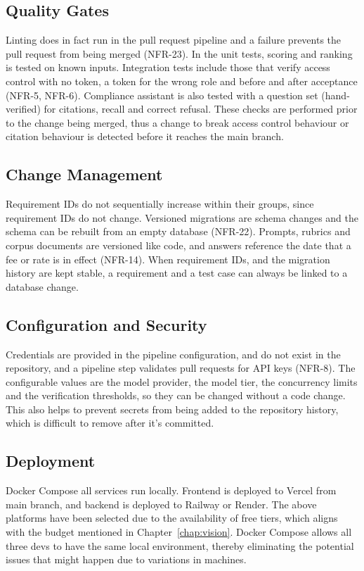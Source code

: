 \documentclass{FastFyp}
\begin{document}
\subsection{Quality Gates}
Linting does in fact run in the pull request pipeline and a failure prevents the pull request from being merged (NFR-23). In the unit tests, scoring and ranking is tested on known inputs. Integration tests include those that verify access control with no token, a token for the wrong role and before and after acceptance (NFR-5, NFR-6). Compliance assistant is also tested with a question set (hand-verified) for citations, recall and correct refusal. These checks are performed prior to the change being merged, thus a change to break access control behaviour or citation behaviour is detected before it reaches the main branch.

\subsection{Change Management}
Requirement IDs do not sequentially increase within their groups, since requirement IDs do not change. Versioned migrations are schema changes and the schema can be rebuilt from an empty database (NFR-22). Prompts, rubrics and corpus documents are versioned like code, and answers reference the date that a fee or rate is in effect (NFR-14). When requirement IDs, and the migration history are kept stable, a requirement and a test case can always be linked to a database change.

\subsection{Configuration and Security}
Credentials are provided in the pipeline configuration, and do not exist in the repository, and a pipeline step validates pull requests for API keys (NFR-8). The configurable values are the model provider, the model tier, the concurrency limits and the verification thresholds, so they can be changed without a code change. This also helps to prevent secrets from being added to the repository history, which is difficult to remove after it's committed.

\subsection{Deployment}
Docker Compose all services run locally. Frontend is deployed to Vercel from main branch, and backend is deployed to Railway or Render. The above platforms have been selected due to the availability of free tiers, which aligns with the budget mentioned in Chapter~\ref{chap:vision}. Docker Compose allows all three devs to have the same local environment, thereby eliminating the potential issues that might happen due to variations in machines.
\end{document}
